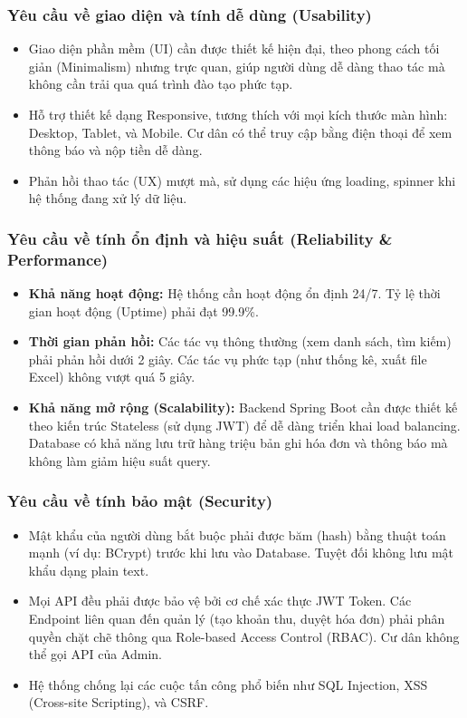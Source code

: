 \documentclass[12pt,a4paper]{article}
\begin{document}
\subsubsection{Yêu cầu về giao diện và tính dễ dùng (Usability)}
\begin{itemize}
    \item Giao diện phần mềm (UI) cần được thiết kế hiện đại, theo phong cách tối giản (Minimalism) nhưng trực quan, giúp người dùng dễ dàng thao tác mà không cần trải qua quá trình đào tạo phức tạp.
    \item Hỗ trợ thiết kế dạng Responsive, tương thích với mọi kích thước màn hình: Desktop, Tablet, và Mobile. Cư dân có thể truy cập bằng điện thoại để xem thông báo và nộp tiền dễ dàng.
    \item Phản hồi thao tác (UX) mượt mà, sử dụng các hiệu ứng loading, spinner khi hệ thống đang xử lý dữ liệu.
\end{itemize}

\subsubsection{Yêu cầu về tính ổn định và hiệu suất (Reliability \& Performance)}
\begin{itemize}
    \item \textbf{Khả năng hoạt động:} Hệ thống cần hoạt động ổn định 24/7. Tỷ lệ thời gian hoạt động (Uptime) phải đạt 99.9\%.
    \item \textbf{Thời gian phản hồi:} Các tác vụ thông thường (xem danh sách, tìm kiếm) phải phản hồi dưới 2 giây. Các tác vụ phức tạp (như thống kê, xuất file Excel) không vượt quá 5 giây.
    \item \textbf{Khả năng mở rộng (Scalability):} Backend Spring Boot cần được thiết kế theo kiến trúc Stateless (sử dụng JWT) để dễ dàng triển khai load balancing. Database có khả năng lưu trữ hàng triệu bản ghi hóa đơn và thông báo mà không làm giảm hiệu suất query.
\end{itemize}

\subsubsection{Yêu cầu về tính bảo mật (Security)}
\begin{itemize}
    \item Mật khẩu của người dùng bắt buộc phải được băm (hash) bằng thuật toán mạnh (ví dụ: BCrypt) trước khi lưu vào Database. Tuyệt đối không lưu mật khẩu dạng plain text.
    \item Mọi API đều phải được bảo vệ bởi cơ chế xác thực JWT Token. Các Endpoint liên quan đến quản lý (tạo khoản thu, duyệt hóa đơn) phải phân quyền chặt chẽ thông qua Role-based Access Control (RBAC). Cư dân không thể gọi API của Admin.
    \item Hệ thống chống lại các cuộc tấn công phổ biến như SQL Injection, XSS (Cross-site Scripting), và CSRF.
\end{itemize}
\end{document}
